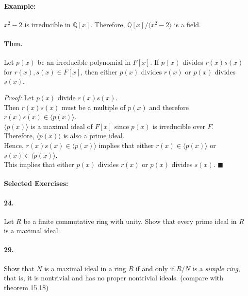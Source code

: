 \documentclass[10pt,a4paper]{article}
\begin{document}
\paragraph{Example:} $x^2-2$ is irreducible in $\mathbb{Q}[x]$. Therefore, $\mathbb{Q}[x]/\langle x^2 -2 \rangle$ is a field.

\paragraph{Thm.} Let $p(x)$ be an irreducible polynomial in $F[x]$. If $p(x)$ divides $r(x)s(x)$ for $r(x),s(x) \in F[x]$, then either $p(x)$ divides $r(x)$ or $p(x)$ divides $s(x)$.

\begin{flushleft}
\textit{Proof:} Let $p(x)$ divide $r(x)s(x)$.\\
Then $r(x)s(x)$ must be a multiple of $p(x)$ and therefore $r(x)s(x) \in \langle p(x) \rangle$.\\
$\langle p(x) \rangle$ is a maximal ideal of $F[x]$ since $p(x)$ is irreducible over $F$.\\
Therefore, $\langle p(x) \rangle$ is also a prime ideal.\\
Hence, $r(x)s(x) \in \langle p(x) \rangle$ implies that either $r(x) \in \langle p(x) \rangle$ or $s(x) \in \langle p(x) \rangle$.\\
This implies that either $p(x)$ divides $r(x)$ or $p(x)$ divides $s(x)$. $\blacksquare$
\end{flushleft} 

\paragraph{Selected Exercises:}

\paragraph{24.} Let $R$ be a finite commutative ring with unity. Show that every prime ideal in $R$ is a maximal ideal.

\paragraph{29.} Show that $N$ is a maximal ideal in a ring $R$ if and only if $R/N$ is a \textit{simple ring}, that is, it is nontrivial and has no proper nontrivial ideals. (compare with theorem 15.18)
\end{document}
